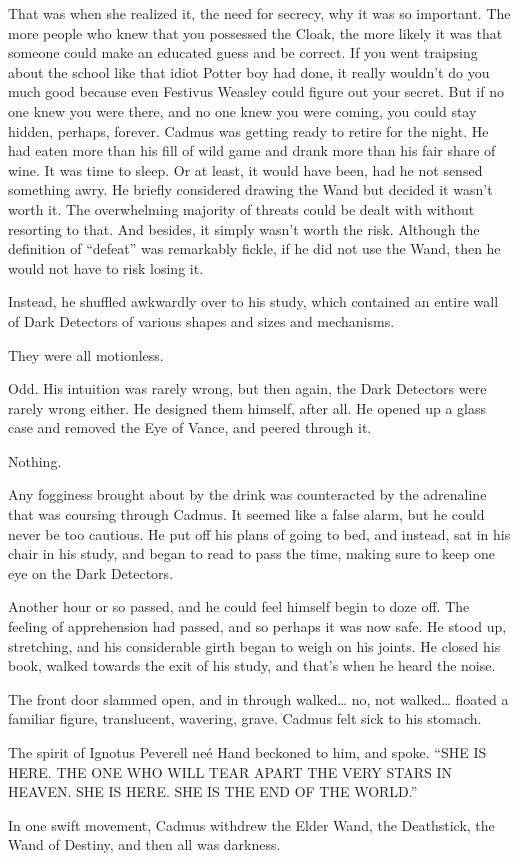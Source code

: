 That was when she realized it, the need for secrecy, why it was so important. The more people who knew that you possessed the Cloak, the more likely it was that someone could make an educated guess and be correct. If you went traipsing about the school like that idiot Potter boy had done, it really wouldn’t do you much good because even Festivus Weasley could figure out your secret. But if no one knew you were there, and no one knew you were coming, you could stay hidden, perhaps, forever.
\simpleline
{}
Cadmus was getting ready to retire for the night. He had eaten more than his fill of wild game and drank more than his fair share of wine. It was time to sleep. Or at least, it would have been, had he not sensed something awry. He briefly considered drawing the Wand but decided it wasn’t worth it. The overwhelming majority of threats could be dealt with without resorting to that. And besides, it simply wasn’t worth the risk. Although the definition of “defeat” was remarkably fickle, if he did not use the Wand, then he would not have to risk losing it.

Instead, he shuffled awkwardly over to his study, which contained an entire wall of Dark Detectors of various shapes and sizes and mechanisms.

They were all motionless.

Odd. His intuition was rarely wrong, but then again, the Dark Detectors were rarely wrong either. He designed them himself, after all. He opened up a glass case and removed the Eye of Vance, and peered through it.

Nothing.

Any fogginess brought about by the drink was counteracted by the adrenaline that was coursing through Cadmus. It seemed like a false alarm, but he could never be too cautious. He put off his plans of going to bed, and instead, sat in his chair in his study, and began to read to pass the time, making sure to keep one eye on the Dark Detectors.

Another hour or so passed, and he could feel himself begin to doze off. The feeling of apprehension had passed, and so perhaps it was now safe. He stood up, stretching, and his considerable girth began to weigh on his joints. He closed his book, walked towards the exit of his study, and that’s when he heard the noise.

The front door slammed open, and in through walked… no, not walked… floated a familiar figure, translucent, wavering, grave. Cadmus felt sick to his stomach.

The spirit of Ignotus Peverell neé Hand beckoned to him, and spoke. “SHE IS HERE. THE ONE WHO WILL TEAR APART THE VERY STARS IN HEAVEN. SHE IS HERE. SHE IS THE END OF THE WORLD.”

In one swift movement, Cadmus withdrew the Elder Wand, the Deathstick, the Wand of Destiny, and then all was darkness.

